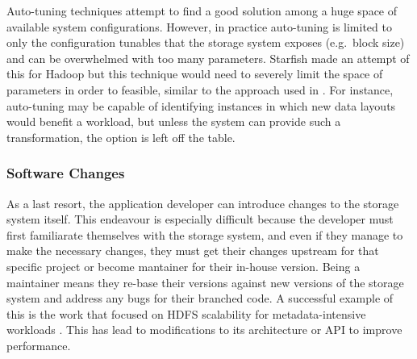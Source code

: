 \documentclass[10pt,twocolumn]{article}
\begin{document}
Auto-tuning techniques attempt to find a good solution among a huge
space of available system configurations. However, in practice
auto-tuning is limited to only the configuration tunables that the
storage system exposes (e.g.~block size) and can be overwhelmed with too
many parameters. Starfish \autocite{herodotou:cidr2011-starfish} made an
attempt of this for Hadoop but this technique would need to severely
limit the space of parameters in order to feasible, similar to the
approach used in \autocite{behzad:sc2013-autotuning}. For instance,
auto-tuning may be capable of identifying instances in which new data
layouts would benefit a workload, but unless the system can provide such
a transformation, the option is left off the table.

\subsubsection{Software Changes}\label{software-changes}

As a last resort, the application developer can introduce changes to the
storage system itself. This endeavour is especially difficult because
the developer must first familiarate themselves with the storage system,
and even if they manage to make the necessary changes, they must get
their changes upstream for that specific project or become mantainer for
their in-house version. Being a maintainer means they re-base their
versions against new versions of the storage system and address any bugs
for their branched code. A successful example of this is the work that
focused on HDFS scalability for metadata-intensive workloads
\autocite{shvachko_hdfs_2010}. This has lead to modifications to its
architecture or API \autocite{balmin:sigmod2012-clydesdale} to improve
performance.
\end{document}
